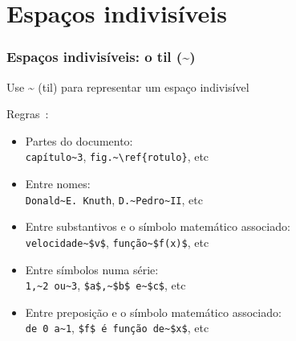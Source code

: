 \documentclass[handout,10pt]{beamer}
\begin{document}
\section{Espaços indivisíveis}
\begin{frame}[fragile]
	\frametitle{Espaços indivisíveis: o til (\~{})}

	\begin{block}{}
		\centering
		Use \~{} (til) para representar um espaço indivisível
	\end{block}
	
	Regras~\cite{TeXbook}:
	\begin{itemize}
		\item<1-> Partes do documento:\\
		\color{blue}\verb|capítulo~3|\color{black},\qquad
		\color{blue}\verb|fig.~\ref{rotulo}|\color{black}, etc
		
		\item<2-> Entre nomes:\\
		\color{blue}\verb|Donald~E. Knuth|\color{black},\qquad
		\color{blue}\verb|D.~Pedro~II|\color{black}, etc
		
		\item<3-> Entre substantivos e o símbolo matemático associado:\\
		\color{blue}\verb|velocidade~$v$|\color{black},\qquad
		\color{blue}\verb|função~$f(x)$|\color{black}, etc
		
		\item<4-> Entre símbolos numa série:\\
		\color{blue}\verb|1,~2 ou~3|\color{black},\qquad
		\color{blue}\verb|$a$,~$b$ e~$c$|\color{black}, etc
		
		\item<5-> Entre preposição e o símbolo matemático associado:\\
		\color{blue}\verb|de 0 a~1|\color{black},\qquad
		\color{blue}\verb|$f$ é função de~$x$|\color{black}, etc		
	\end{itemize}
\end{frame}
\ifhandout\else
\end{document}
